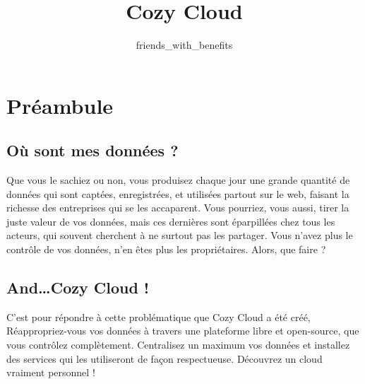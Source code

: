 \documentclass{42-fr}
\begin{document}
                           \title{Cozy Cloud}
                          \subtitle{friends\_with\_benefits}


\maketitle

\tableofcontents


\chapter{Préambule}


	\section{O\`u sont mes donn\'ees ?}

		Que vous le sachiez ou non, vous produisez chaque jour une grande quantit\'e de donn\'ees
		qui sont capt\'ees, enregistr\'ees, et utilis\'ees partout sur le web, faisant
		la richesse des entreprises qui se les accaparent. Vous pourriez, vous aussi,
		tirer la juste valeur de vos donn\'ees, mais ces derni\`eres sont \'eparpill\'ees
		chez tous les acteurs, qui souvent cherchent \`a ne surtout pas les partager.
		Vous n'avez plus le contrôle de vos donn\'ees, n'en \^etes plus les propri\'etaires.
		Alors, que faire ?


	\section{And…Cozy Cloud !}

		C'est pour r\'epondre \`a cette probl\'ematique que Cozy Cloud a \'et\'e  cr\'e\'e,
		R\'eappropriez-vous vos donn\'ees \`a travers une plateforme libre et open-source, 
		que vous contr\^olez compl\`etement. Centralisez un maximum vos donn\'ees et 
		installez des services qui les utiliseront de façon respectueuse. D\'ecouvrez 
		un cloud vraiment personnel !
\end{document}
